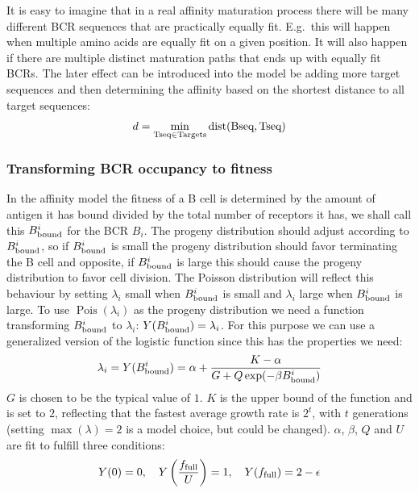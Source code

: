 It is easy to imagine that in a real affinity maturation process there will be many different BCR sequences that are practically equally fit.
E.g.\ this will happen when multiple amino acids are equally fit on a given position.
It will also happen if there are multiple distinct maturation paths that ends up with equally fit BCRs.
The later effect can be introduced into the model be adding more target sequences and then determining the affinity based on the shortest distance to all target sequences:
$$
d = \mathop{\mathrm{\min}}\limits_{\text{Tseq} \in \text{Targets}} \operatorname{dist}(\text{Bseq}, \text{Tseq})
$$






\subsubsection{Transforming BCR occupancy to fitness}
In the affinity model the fitness of a B cell is determined by the amount of antigen it has bound divided by the total number of receptors it has, we shall call this $B^i_{\text{bound}}$ for the BCR $B_i$.
The progeny distribution should adjust according to $B^i_{\text{bound}}$, so if $B^i_{\text{bound}}$ is small the progeny distribution should favor terminating the B cell and opposite, if $B^i_{\text{bound}}$ is large this should cause the progeny distribution to favor cell division.
The Poisson distribution will reflect this behaviour by setting $\lambda_i$ small when $B^i_{\text{bound}}$ is small and $\lambda_i$ large when $B^i_{\text{bound}}$ is large.
To use $\operatorname{Pois}(\lambda_i)$ as the progeny distribution we need a function transforming $B^i_{\text{bound}}$ to $\lambda_i$: $Y(B^i_{\text{bound}}) = \lambda_i$.
For this purpose we can use a generalized version of the logistic function since this has the properties we need:
\begin{equation}
\lambda_i = Y(B^i_{\text{bound}}) = \alpha + \frac{K - \alpha}{G + Q \exp(-\beta B^i_{\text{bound}})}
  \label{eq:BA_trans}
\end{equation}
$G$ is chosen to be the typical value of $1$.
$K$ is the upper bound of the function and is set to $2$, reflecting that the fastest average growth rate is $2^t$, with $t$ generations (setting $\operatorname{max}(\lambda) = 2$ is a model choice, but could be changed).
$\alpha$, $\beta$, $Q$ and $U$ are fit to fulfill three conditions:
\begin{equation}
Y(0) = 0, \ \ \ Y \left(\frac{f_{\text{full}}}{U} \right) = 1, \ \ \ Y(f_{\text{full}}) = 2 - \epsilon
  \label{eq:BA_cond}
\end{equation}
